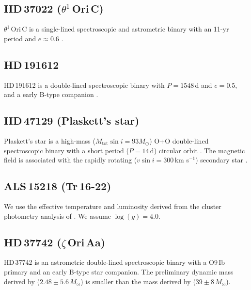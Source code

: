\documentclass[useAMS,usenatbib]{mn2e}
\newcommand{\vsini}{v \sin i}
\newcommand{\sm}{\,s$^{-1}$}
\newcommand{\msol}{M_\odot}
\begin{document}
\setcounter{subsection}{2}
\subsection{HD\,37022 ($\theta^1$\,Ori\,C)}

$\theta^1$\,Ori\,C is a single-lined spectroscopic and astrometric binary with an 11-yr period and $e\approx0.6$ \citep{2009A&A...497..195K}.

\setcounter{subsection}{3}
\subsection{HD\,191612}

HD\,191612 is a double-lined spectroscopic binary with $P=1548$\,d and $e=0.5$, and a early B-type companion \citep{2007MNRAS.381..433H,2011MNRAS.416.3160W}. 

\setcounter{subsection}{5}
\subsection{HD\,47129 (Plaskett's star)}

Plaskett's star is a high-mass ($M_\mathrm{tot}\sin i=93\msol$) O+O double-lined spectroscopic binary with a short period ($P=14$\,d) circular orbit \citep{2008A&A...489..713L}. The magnetic field is associated with the rapidly rotating ($\vsini=300$\,km\,\sm) secondary star \citep{Grunhut2012_plaskett}. 

\setcounter{subsection}{7}
\subsection{ALS\,15218 (Tr\,16-22)}

We use the effective temperature and luminosity derived from the cluster photometry analysis of \citet{2011ApJS..194....5G}. We assume $\log(g)=4.0$. 

\setcounter{subsection}{9}
\subsection{HD\,37742 ($\zeta$\,Ori\,Aa)}

HD\,37742 is an astrometric double-lined spectroscopic binary \citep{2000ApJ...540L..91H} with a O9\,Ib primary and an early B-type star companion. The preliminary dynamic mass derived by \cite{2011IAUS..272..539R} ($2.48\pm5.6$\,$\msol$) is smaller than the mass derived by \citet{2008MNRAS.389...75B} ($39\pm8$\,$\msol$).
\end{document}
